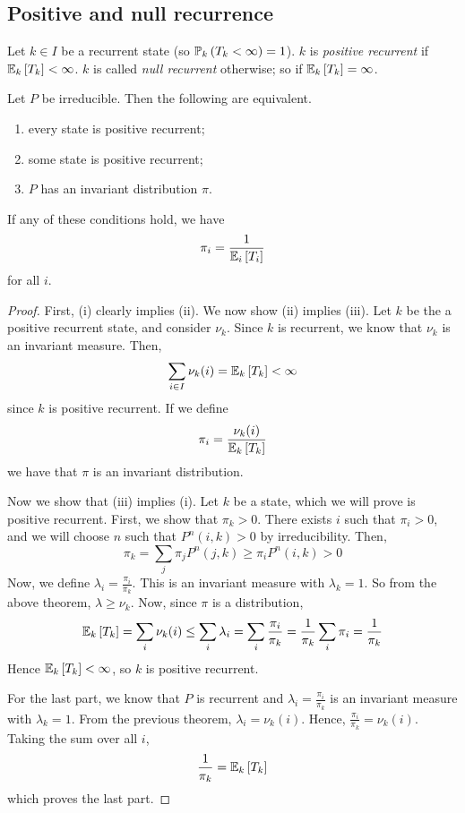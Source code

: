 \subsection{Positive and null recurrence}
\begin{definition}
	Let \( k \in I \) be a recurrent state (so \( \mathbb{P}_{k}\left({T_k < \infty}\right) = 1 \)).
	\( k \) is \textit{positive recurrent} if \( \mathbb{E}_{k}\left[{T_k}\right] < \infty \).
	\( k \) is called \textit{null recurrent} otherwise; so if \( \mathbb{E}_{k}\left[{T_k}\right] = \infty \).
\end{definition}
\begin{theorem}
	Let \( P \) be irreducible.
	Then the following are equivalent.
	\begin{enumerate}
		\item every state is positive recurrent;
		\item some state is positive recurrent;
		\item \( P \) has an invariant distribution \( \pi \).
	\end{enumerate}
	If any of these conditions hold, we have
	\[
		\pi_i = \frac{1}{\mathbb{E}_{i}\left[{T_i}\right]}
	\]
	for all \( i \).
\end{theorem}
\begin{proof}
	First, (i) clearly implies (ii).
	We now show (ii) implies (iii).
	Let \( k \) be the a positive recurrent state, and consider \( \nu_k \).
	Since \( k \) is recurrent, we know that \( \nu_k \) is an invariant measure.
	Then,
	\[
		\sum_{i \in I} \nu_k(i) = \mathbb{E}_{k}\left[{T_k}\right] < \infty
	\]
	since \( k \) is positive recurrent.
	If we define
	\[
		\pi_i = \frac{\nu_k(i)}{\mathbb{E}_{k}\left[{T_k}\right]}
	\]
	we have that \( \pi \) is an invariant distribution.

	Now we show that (iii) implies (i).
	Let \( k \) be a state, which we will prove is positive recurrent.
	First, we show that \( \pi_k > 0 \).
	There exists \( i \) such that \( \pi_i > 0 \), and we will choose \( n \) such that \( P^n(i,k) > 0 \) by irreducibility.
	Then,
	\[
		\pi_k = \sum_j \pi_j P^n(j,k) \geq \pi_i P^n(i,k) > 0
	\]
	Now, we define \( \lambda_i = \frac{\pi_i}{\pi_k} \).
	This is an invariant measure with \( \lambda_k = 1 \).
	So from the above theorem, \( \lambda \geq \nu_k \).
	Now, since \( \pi \) is a distribution,
	\[
		\mathbb{E}_{k}\left[{T_k}\right] = \sum_i \nu_k(i) \leq \sum_i \lambda_i = \sum_i \frac{\pi_i}{\pi_k} = \frac{1}{\pi_k} \sum_i \pi_i = \frac{1}{\pi_k}
	\]
	Hence \( \mathbb{E}_{k}\left[{T_k}\right] < \infty \), so \( k \) is positive recurrent.

	For the last part, we know that \( P \) is recurrent and \( \lambda_i = \frac{\pi_i}{\pi_k} \) is an invariant measure with \( \lambda_k = 1 \).
	From the previous theorem, \( \lambda_i = \nu_k(i) \).
	Hence, \( \frac{\pi_i}{\pi_k} = \nu_k(i) \).
	Taking the sum over all \( i \),
	\[
		\frac{1}{\pi_k} = \mathbb{E}_{k}\left[{T_k}\right]
	\]
	which proves the last part.
\end{proof}
